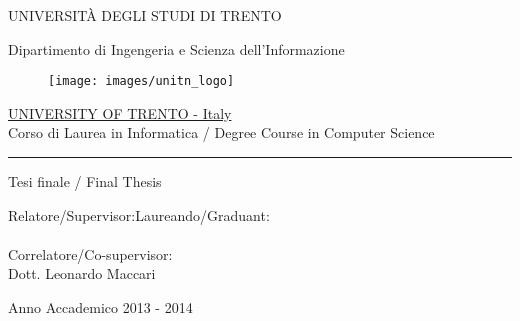 \begin{titlingpage}
\setulmargins{0.5cm}{*}{*}

\begin{center}
	\LARGE{UNIVERSIT\`A DEGLI STUDI DI TRENTO}
	
	\large
	Dipartimento di Ingengeria e Scienza dell'Informazione\\
	\begin{figure}[ht] 
    \center \texttt{[image: images/unitn\_logo]}
	\end{figure}
	\underline{UNIVERSITY OF TRENTO - Italy}\\
	\vspace*{10mm}
	Corso di Laurea in Informatica / Degree Course in Computer Science\\
	\rule{\linewidth}{1pt}
	\vspace*{10mm}
	Tesi finale / Final Thesis\\
	\vspace*{18mm}
	\huge{\bfseries \myTitle}
\end{center}
\vspace*{16mm}
\begin{flushleft}
	Relatore/Supervisor:Laureando/Graduant:\\
	\myProf{}\myName\\
	\vspace*{3mm}
  Correlatore/Co-supervisor:\\
  Dott. Leonardo Maccari\\
	\vspace*{3mm}
\end{flushleft}
\vspace*{15mm}
\normalsize
\begin{center}
	Anno Accademico 2013 - 2014
\end{center}

\vfill
\end{titlingpage}


